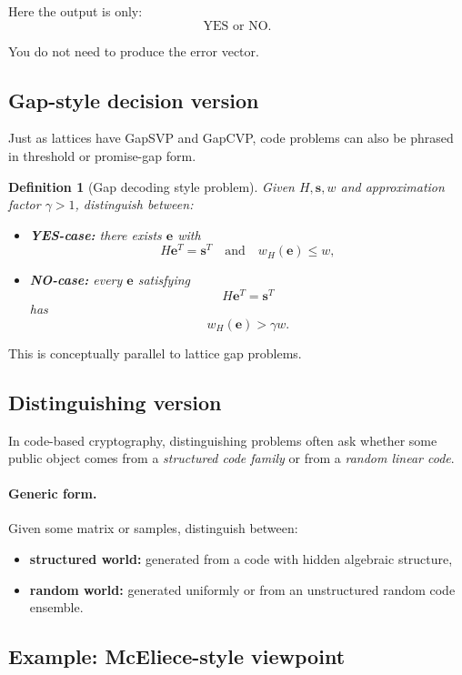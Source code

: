 \documentclass[11pt]{article}
\newtheorem{definition}{Definition}
\begin{document}
	Here the output is only:
	\[
	\text{YES or NO.}
	\]
	
	\noindent
	You do not need to produce the error vector.
	
	\subsection{Gap-style decision version}
	
	Just as lattices have GapSVP and GapCVP, code problems can also be phrased in threshold or promise-gap form.
	
	\begin{definition}[Gap decoding style problem]
		Given $H,\bm s,w$ and approximation factor $\gamma > 1$, distinguish between:
		\begin{itemize}
			\item \textbf{YES-case:} there exists $\bm e$ with
			\[
			H\bm e^T = \bm s^T
			\quad \text{and} \quad
			w_H(\bm e) \le w,
			\]
			\item \textbf{NO-case:} every $\bm e$ satisfying
			\[
			H\bm e^T = \bm s^T
			\]
			has
			\[
			w_H(\bm e) > \gamma w.
			\]
		\end{itemize}
	\end{definition}
	
	This is conceptually parallel to lattice gap problems.
	
	\subsection{Distinguishing version}
	
	In code-based cryptography, distinguishing problems often ask whether some public object comes from a \emph{structured code family} or from a \emph{random linear code}.
	
	\paragraph{Generic form.}
	Given some matrix or samples, distinguish between:
	
	\begin{itemize}
		\item \textbf{structured world:} generated from a code with hidden algebraic structure,
		\item \textbf{random world:} generated uniformly or from an unstructured random code ensemble.
	\end{itemize}
	
	\subsection{Example: McEliece-style viewpoint}
	
\end{document}
